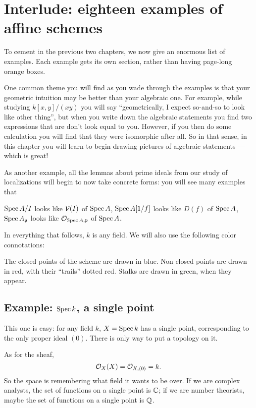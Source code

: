 \chapter{Interlude: eighteen examples of affine schemes}
\label{ch:spec_examples}
To cement in the previous two chapters,
we now give an enormous list of examples.
Each example gets its own section,
rather than having page-long orange boxes.

One common theme you will find as you wade through
the examples is that your geometric intuition may
be better than your algebraic one.
For example, while studying $k[x,y] / (xy)$ you will say
``geometrically, I expect so-and-so to look like other thing'',
but when you write down the algebraic statements
you find two expressions that are don't look equal to you.
However, if you then do some calculation you will
find that they were isomorphic after all.
So in that sense, in this chapter you will learn to begin drawing
pictures of algebraic statements --- which is great!

As another example, all the lemmas about
prime ideals from our study of localizations
will begin to now take concrete forms:
you will see many examples that
\begin{itemize}
	\ii $\operatorname{Spec} A/I$ looks like $\mathcal V(I)$ of $\operatorname{Spec} A$,
	\ii $\operatorname{Spec} A[1/f]$ looks like $D(f)$ of $\operatorname{Spec} A$,
	\ii $\operatorname{Spec} A_\mathfrak p$ looks like $\mathcal O_{\operatorname{Spec} A, \mathfrak p}$ of $\operatorname{Spec} A$.
\end{itemize}

In everything that follows, $k$ is any field.
We will also use the following color connotations:
\begin{itemize}
	\ii The closed points of the scheme are drawn in blue.
	\ii Non-closed points are drawn in red,
	with their ``trails'' dotted red.
	\ii Stalks are drawn in green, when they appear.
\end{itemize}


\section{Example: $\operatorname{Spec} k$, a single point}
This one is easy: for any field $k$,
$X = \operatorname{Spec} k$ has a single point,
corresponding to the only proper ideal $(0)$.
There is only way to put a topology on it.

As for the sheaf,
\[ \mathcal O_X(X) = \mathcal O_{X,(0)} = k. \]
So the space is remembering what field it wants to be over.
If we are complex analysts,
the set of functions on a single point is $\mathbb C$;
if we are number theorists,
maybe the set of functions on a single point is $\mathbb Q$.

